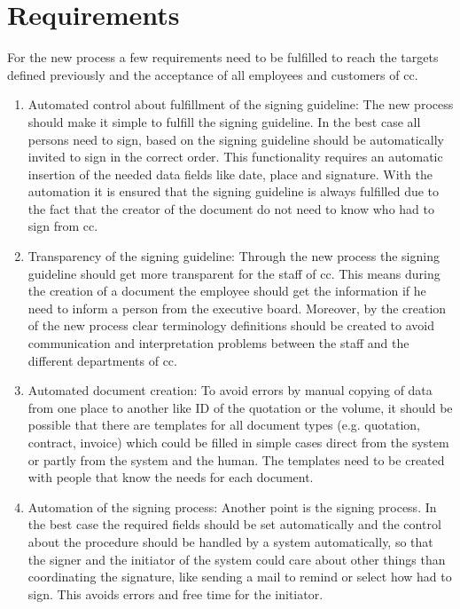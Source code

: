 \section{Requirements}
For the new process a few requirements need to be fulfilled to reach the targets defined previously and the acceptance of all employees and customers of \gls{cc}.
\begin{enumerate}
	 \item Automated control about fulfillment of the signing guideline: \newline
	 The new process should make it simple to fulfill the signing guideline. In the best case all persons need to sign, based on the signing guideline should be automatically invited to sign in the correct order. This functionality requires an automatic insertion of the needed data fields like date, place and signature. With the automation it is ensured that the signing guideline is always fulfilled due to the fact that the creator of the document do not need to know who had to sign from \gls{cc}.
	 \item Transparency of the signing guideline: \newline
	 Through the new process the signing guideline should get more transparent for the staff of \gls{cc}. This means during the creation of a document the employee should get the information if he need to inform a person from the executive board. Moreover, by the creation of the new process clear terminology definitions should be created to avoid communication and interpretation problems between the staff and the different departments of \gls{cc}.
	 \item Automated document creation: \newline 
	 To avoid errors by manual copying of data from one place to another like ID of the quotation or the volume, it should be possible that there are templates for all document types (e.g. quotation, contract, invoice) which could be filled in simple cases direct from the system or partly from the system and the human. The templates need to be created with people that know the needs for each document.
	 \item Automation of the signing process: \newline
	 Another point is the signing process. In the best case the required fields should be set automatically and the control about the  procedure should be handled by a system automatically, so that the signer and the initiator of the system could care about other things than coordinating the signature, like sending a mail to remind or select how had to sign. This avoids errors and free time for the initiator.

\end{enumerate}
